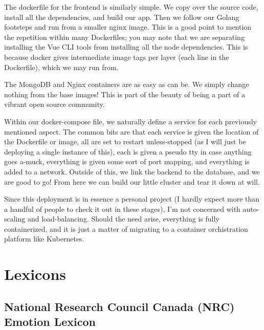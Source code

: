 \documentclass[11pt, twoside, reqno]{book}
\begin{document}
\label{Vue Frontend Dockerfile}

The dockerfile for the frontend is similarly simple. We copy over the source code, install all the dependencies, and build our app. Then we follow our Golang footsteps and run from a smaller nginx image. This is a good point to mention the repetition within many Dockerfiles; you may note that we are separating installing the Vue CLI tools from installing all the node dependencies. This is because docker gives intermediate image tags per layer (each line in the Dockerfile), which we may run from.

\label{Mongo and Nginx}

The MongoDB and Nginx containers are as easy as can be. We simply change nothing from the base images! This is part of the beauty of being a part of a vibrant open source community.

\label{The Composition}

Within our docker-compose file, we naturally define a service for each previously mentioned aspect. The common bits are that each service is given the location of the Dockerfile or image, all are set to restart unless-stopped (as I will just be deploying a single instance of this), each is given a pseudo tty in case anything goes a-muck, everything is given some sort of port mapping, and everything is added to a network. Outside of this, we link the backend to the database, and we are good to go! From here we can build our little cluster and tear it down at will.

Since this deployment is in essence a personal project (I hardly expect more than a handful of people to check it out in these stages), I'm not concerned with auto-scaling and load-balancing. Should the need arise, everything is fully containerized, and it is just a matter of migrating to a container orchistration platform like Kubernetes.

\chapter{Lexicons}


\section{National Research Council Canada (NRC) Emotion Lexicon}
\end{document}
